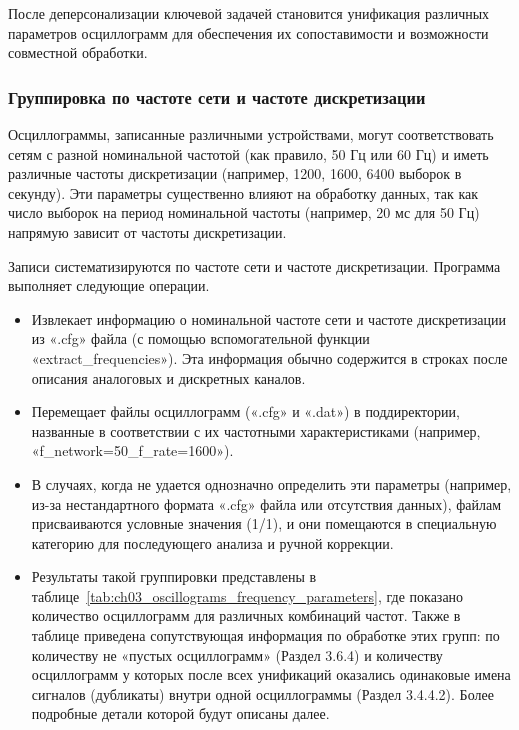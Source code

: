 После деперсонализации ключевой задачей становится унификация различных параметров
осциллограмм для обеспечения их сопоставимости и возможности совместной
обработки.\par\vspace{0.2cm}

\subsubsection{Группировка по частоте сети и частоте дискретизации}\label{sec:ch3_frequency_grouping}

Осциллограммы, записанные различными устройствами, могут соответствовать сетям с разной
номинальной частотой (как правило, 50 Гц или 60 Гц) и иметь различные частоты
дискретизации (например, 1200, 1600, 6400 выборок в секунду). Эти параметры существенно
влияют на обработку данных, так как число выборок на период номинальной частоты
(например, 20 мс для 50 Гц) напрямую зависит от частоты дискретизации.\par\vspace{0.2cm}

Записи систематизируются по частоте сети и частоте дискретизации. Программа выполняет
следующие операции.\par\vspace{0.2cm}

\begin{itemize}[itemsep=2pt,topsep=2pt]
  \item Извлекает информацию о номинальной частоте сети и частоте дискретизации из «.cfg» файла (с помощью вспомогательной функции «extract\_frequencies»). Эта информация обычно содержится в строках после описания аналоговых и дискретных каналов.
  \item Перемещает файлы осциллограмм («.cfg» и «.dat») в поддиректории, названные в соответствии с их частотными характеристиками (например, «f\_\allowbreak network=50\_\allowbreak f\_\allowbreak rate=1600»).
  \item В случаях, когда не удается однозначно определить эти параметры (например, из-за нестандартного формата «.cfg» файла или отсутствия данных), файлам присваиваются условные значения (1/1), и они помещаются в специальную категорию для последующего анализа и ручной коррекции.
  \item Результаты такой группировки представлены в таблице~\ref{tab:ch03_oscillograms_frequency_parameters}, где показано количество осциллограмм для различных комбинаций частот. Также в таблице приведена сопутствующая информация по обработке этих групп: по количеству не «пустых осциллограмм» (Раздел 3.6.4) и количеству осциллограмм у которых после всех унификаций оказались одинаковые имена сигналов (дубликаты) внутри одной осциллограммы (Раздел 3.4.4.2). Более подробные детали которой будут описаны далее.
\end{itemize}\par\vspace{0.2cm}

